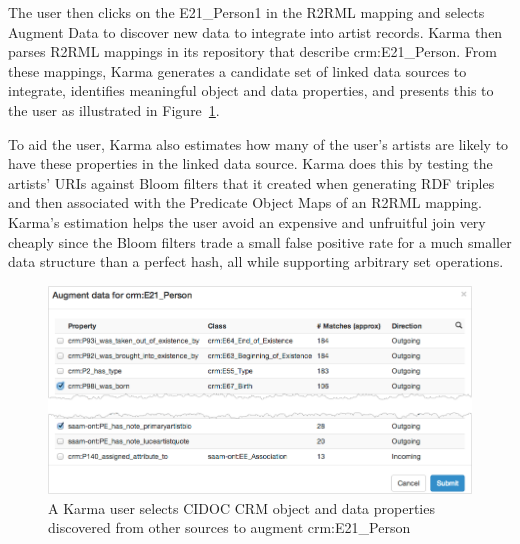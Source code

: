 The user then clicks on the E21\_Person1 in the R2RML mapping and selects Augment Data to discover new data to integrate into artist records.  
Karma then parses R2RML mappings in its repository that describe crm:E21\_Person.
From these mappings, Karma generates a candidate set of linked data sources to integrate, identifies meaningful object and data properties, and presents this to the user as illustrated in Figure~\ref{fig:search-screenshot}.

To aid the user, Karma also estimates how many of the user's artists are likely to have these properties in the linked data source.  
Karma does this by testing the artists' URIs against Bloom filters that it created when generating RDF triples and then associated with the Predicate Object Maps of an R2RML mapping.  
Karma's estimation helps the user avoid an expensive and unfruitful join very cheaply since the Bloom filters trade a small false positive rate for a much smaller data structure than a perfect hash, all while supporting arbitrary set operations.  
\begin{figure}[t]
\centering
\includegraphics[width=4.9in]{images/5-search.png}
\vspace{-5mm}
\caption{A Karma user selects CIDOC CRM object and data properties discovered from other sources to augment crm:E21\_Person}
\vspace{-21pt}
\label{fig:search-screenshot}
\end{figure}